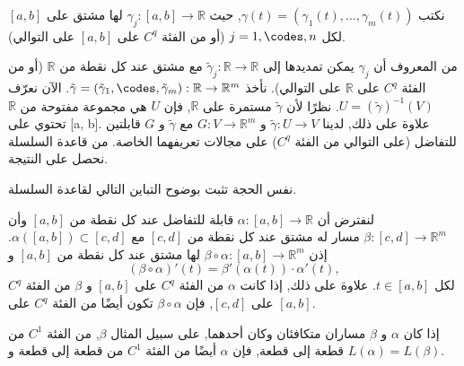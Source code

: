 \begin{demonstration}
    
نكتب \( \gamma(t) = (\gamma_1(t), \ldots, \gamma_m(t)) \), حيث \( \gamma_j : [a, b] \to \mathbb{R} \) لها مشتق على $[a, b]$ لكل \( j = 1, \codes, n \) (أو من الفئة \( C^q \) على $[a, b]$ على التوالي).

من المعروف أن \( \gamma_j \) يمكن تمديدها إلى \( \tilde{\gamma}_j : \mathbb{R} \to \mathbb{R} \) مع مشتق عند كل نقطة من \( \mathbb{R} \) (أو من الفئة \( C^q \) على \( \mathbb{R} \) على التوالي). نأخذ \( \tilde{\gamma} = (\tilde{\gamma}_1, \codes, \tilde{\gamma}_m) : \mathbb{R} \to \mathbb{R}^m \). الآن نعرّف \( U = (\tilde{\gamma})^{-1}(V) \). نظرًا لأن \( \tilde{\gamma} \) مستمرة على \( \mathbb{R} \), فإن \( U \) هي مجموعة مفتوحة من \( \mathbb{R} \) تحتوي على [a, b]. علاوة على ذلك, لدينا \( \tilde{\gamma} : U \to V \) و \( G : V \to \mathbb{R}^m \) مع \( \tilde{\gamma} \) و \( G \) قابلتين للتفاضل (على التوالي من الفئة \( C^q \)) على مجالات تعريفهما الخاصة. من قاعدة السلسلة نحصل على النتيجة.
\end{demonstration}

نفس الحجة تثبت بوضوح التباين التالي لقاعدة السلسلة.

\begin{lemma}
    
لنفترض أن \( \alpha : [a, b] \to \mathbb{R} \) قابلة للتفاضل عند كل نقطة من $[a, b]$ وأن \( \beta : [c, d] \to \mathbb{R}^m \) مسار له مشتق عند كل نقطة من $[c, d]$ مع \( \alpha([a, b]) \subset [c, d] \). إذن \( \beta \circ \alpha : [a, b] \to \mathbb{R}^m \) لها مشتق عند كل نقطة من $[a, b]$ و
\[ (\beta \circ \alpha)'(t) = \beta'(\alpha(t)) \cdot \alpha'(t), \]
لكل \( t \in [a, b] \). علاوة على ذلك, إذا كانت \( \alpha \) من الفئة \( C^q \) على $[a, b]$ و \( \beta \) من الفئة \( C^q \) على $[c, d]$, فإن \( \beta \circ \alpha \) تكون أيضًا من الفئة \( C^q \) على $[a, b]$.
\end{lemma}

\begin{lemma}
إذا كان \( \alpha \) و \( \beta \) مساران متكافئان وكان أحدهما, على سبيل المثال \( \beta \), من الفئة \( C^1 \) من قطعة إلى قطعة, فإن \( \alpha \) أيضًا من الفئة \( C^1 \) من قطعة إلى قطعة و \( L(\alpha) = L(\beta) \).
\end{lemma}

